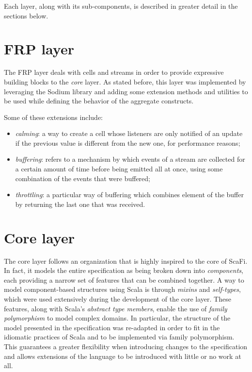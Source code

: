 Each layer, along with its sub-components, is described in greater detail in the sections below.

\section{FRP layer}

The FRP layer deals with cells and streams in order to provide expressive building blocks to the \textit{core} layer.
%
As stated before, this layer was implemented by leveraging the Sodium library and adding some extension methods and utilities to be used while defining the behavior of the aggregate constructs.

Some of these extensions include:
%
\begin{itemize}
    \item \textit{calming}: a way to create a cell whose listeners are only notified of an update if the previous value is different from the new one, for performance reasons;
    \item \textit{buffering}: refers to a mechanism by which events of a stream are collected for a certain amount of time before being emitted all at once, using some combination of the events that were buffered;
    \item \textit{throttling}: a particular way of buffering which combines element of the buffer by returning the last one that was received.
\end{itemize}


\section{Core layer}

The core layer follows an organization that is highly inspired to the core of ScaFi.
%
In fact, it models the entire specification as being broken down into \textit{components}, each providing a narrow set of features that can be combined together.
%
A way to model component-based structures using Scala is through \textit{mixins} and \textit{self-types}, which were used extensively during the development of the core layer.
%
These features, along with Scala's \textit{abstract type members}, enable the use of \textit{family polymorphism} \cite{10.1007/3-540-45337-7_17} to model complex domains.
%
In particular, the structure of the model presented in the specification was re-adapted in order to fit in the idiomatic practices of Scala and to be implemented via family polymorphism.
%
This guarantees a greater flexibility when introducing changes to the specification and allows extensions of the language to be introduced with little or no work at all.

